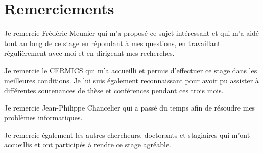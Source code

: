 \chapter*{Remerciements}

Je remercie Frédéric Meunier qui m'a proposé ce sujet intéressant et qui m'a aidé tout au long de ce stage en répondant à mes questions, en travaillant régulièrement avec moi et en dirigeant mes recherches.

Je remercie le CERMICS qui m'a accueilli et permis d'effectuer ce stage dans les meilleures conditions. Je lui suis également reconnaissant pour avoir pu assister à différentes soutenances de thèse et conférences pendant ces trois mois.

Je remercie Jean-Philippe Chancelier qui a passé du temps afin de résoudre mes problèmes informatiques.

Je remercie également les autres chercheurs, doctorants et stagiaires qui m'ont accueillis et ont participés à rendre ce stage agréable.
